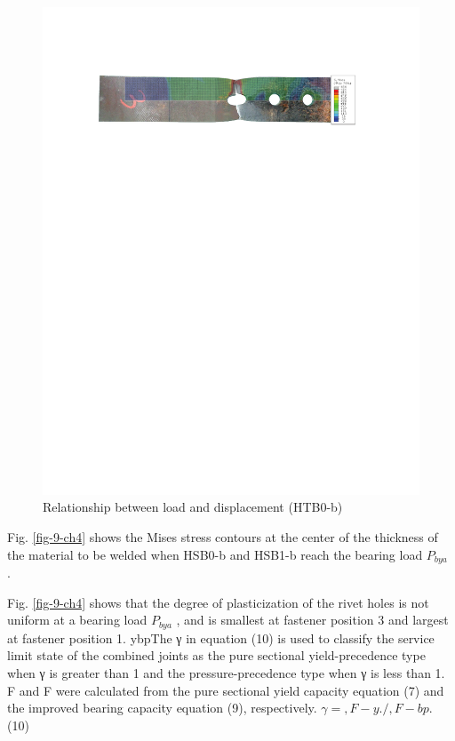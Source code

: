 \begin{figure}[htbp]
\begin{minipage}[t]{1\textwidth}
    \includegraphics{imgs/ch4/ch4fig10.pdf}
    \caption{Relationship between load and displacement (HTB0-b)}
    \label{ch4fig10}
    \end{minipage}
\end{figure}


Fig. \ref{fig-9-ch4} shows the Mises stress contours at the center of the thickness of the material to be welded when HSB0-b and HSB1-b reach the bearing load $P_{bya}$ .

Fig. \ref{fig-9-ch4} shows that the degree of plasticization of the rivet holes is not uniform at a bearing load $P_{bya}$ , and is smallest at fastener position 3 and largest at fastener position 1. ybpThe γ in equation (10) is used to classify the service limit state of the combined joints as the pure sectional yield-precedence type when γ is greater than 1 and the pressure-precedence type when γ is less than 1. F  and F  were calculated from the pure sectional yield capacity equation (7) and the improved bearing capacity equation (9), respectively.
$γ=,F-y./,F-bp.$ (10)


